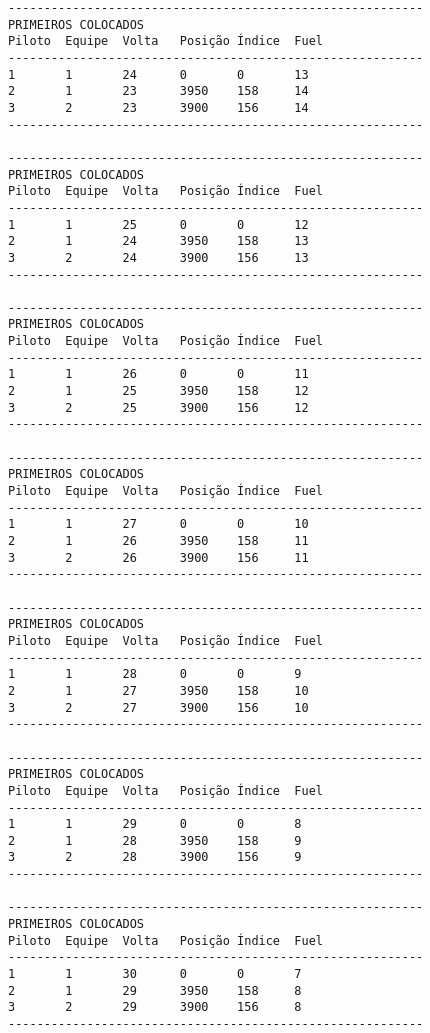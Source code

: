 \documentclass[12pt]{article}
\begin{document}
\begin{verbatim}
----------------------------------------------------------
PRIMEIROS COLOCADOS
Piloto  Equipe  Volta   Posição Índice  Fuel
----------------------------------------------------------
1       1       24      0       0       13
2       1       23      3950    158     14
3       2       23      3900    156     14
----------------------------------------------------------

----------------------------------------------------------
PRIMEIROS COLOCADOS
Piloto  Equipe  Volta   Posição Índice  Fuel
----------------------------------------------------------
1       1       25      0       0       12
2       1       24      3950    158     13
3       2       24      3900    156     13
----------------------------------------------------------

----------------------------------------------------------
PRIMEIROS COLOCADOS
Piloto  Equipe  Volta   Posição Índice  Fuel
----------------------------------------------------------
1       1       26      0       0       11
2       1       25      3950    158     12
3       2       25      3900    156     12
----------------------------------------------------------

----------------------------------------------------------
PRIMEIROS COLOCADOS
Piloto  Equipe  Volta   Posição Índice  Fuel
----------------------------------------------------------
1       1       27      0       0       10
2       1       26      3950    158     11
3       2       26      3900    156     11
----------------------------------------------------------

----------------------------------------------------------
PRIMEIROS COLOCADOS
Piloto  Equipe  Volta   Posição Índice  Fuel
----------------------------------------------------------
1       1       28      0       0       9
2       1       27      3950    158     10
3       2       27      3900    156     10
----------------------------------------------------------

----------------------------------------------------------
PRIMEIROS COLOCADOS
Piloto  Equipe  Volta   Posição Índice  Fuel
----------------------------------------------------------
1       1       29      0       0       8
2       1       28      3950    158     9
3       2       28      3900    156     9
----------------------------------------------------------

----------------------------------------------------------
PRIMEIROS COLOCADOS
Piloto  Equipe  Volta   Posição Índice  Fuel
----------------------------------------------------------
1       1       30      0       0       7
2       1       29      3950    158     8
3       2       29      3900    156     8
----------------------------------------------------------


\end{verbatim}
\end{document}
